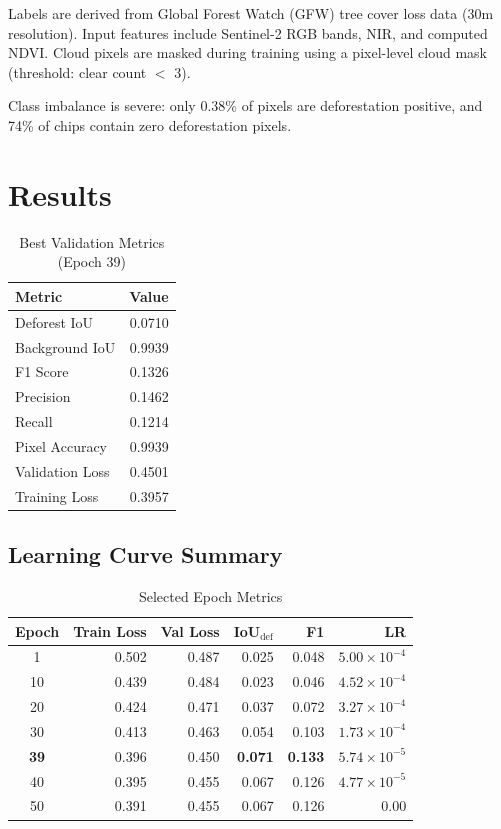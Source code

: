 \documentclass[11pt,a4paper]{article}
\begin{document}
Labels are derived from Global Forest Watch (GFW) tree cover loss data (30m resolution). Input features include Sentinel-2 RGB bands, NIR, and computed NDVI. Cloud pixels are masked during training using a pixel-level cloud mask (threshold: clear count $<$ 3).

Class imbalance is severe: only 0.38\% of pixels are deforestation positive, and 74\% of chips contain zero deforestation pixels.

\section{Results}

\begin{table}[h]
\centering
\caption{Best Validation Metrics (Epoch 39)}
\begin{tabular}{lr}
\toprule
\textbf{Metric} & \textbf{Value} \\
\midrule
Deforest IoU & 0.0710 \\
Background IoU & 0.9939 \\
F1 Score & 0.1326 \\
Precision & 0.1462 \\
Recall & 0.1214 \\
Pixel Accuracy & 0.9939 \\
Validation Loss & 0.4501 \\
Training Loss & 0.3957 \\
\bottomrule
\end{tabular}
\end{table}

\subsection{Learning Curve Summary}

\begin{table}[h]
\centering
\caption{Selected Epoch Metrics}
\begin{tabular}{crrrrr}
\toprule
\textbf{Epoch} & \textbf{Train Loss} & \textbf{Val Loss} & \textbf{IoU$_\text{def}$} & \textbf{F1} & \textbf{LR} \\
\midrule
1 & 0.502 & 0.487 & 0.025 & 0.048 & $5.00 \times 10^{-4}$ \\
10 & 0.439 & 0.484 & 0.023 & 0.046 & $4.52 \times 10^{-4}$ \\
20 & 0.424 & 0.471 & 0.037 & 0.072 & $3.27 \times 10^{-4}$ \\
30 & 0.413 & 0.463 & 0.054 & 0.103 & $1.73 \times 10^{-4}$ \\
\textbf{39} & 0.396 & 0.450 & \textbf{0.071} & \textbf{0.133} & $5.74 \times 10^{-5}$ \\
40 & 0.395 & 0.455 & 0.067 & 0.126 & $4.77 \times 10^{-5}$ \\
50 & 0.391 & 0.455 & 0.067 & 0.126 & 0.00 \\
\bottomrule
\end{tabular}
\end{table}
\end{document}
